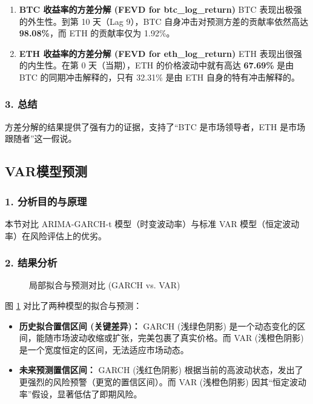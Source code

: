 \documentclass[a4paper]{ctexart}
\begin{document}
	\begin{enumerate}
		\item \textbf{BTC 收益率的方差分解 (FEVD for btc\_log\_return)}
		BTC 表现出极强的外生性。到第 10 天（Lag 9），BTC 自身冲击对预测方差的贡献率依然高达 \textbf{98.08\%}，而 ETH 的贡献率仅为 1.92\%。
		\item \textbf{ETH 收益率的方差分解 (FEVD for eth\_log\_return)}
		ETH 表现出很强的内生性。在第 0 天（当期），ETH 的价格波动中就有高达 \textbf{67.69\%} 是由 BTC 的同期冲击解释的，只有 32.31\% 是由 ETH 自身的特有冲击解释的。
	\end{enumerate}
	
	\subsubsection{3. 总结}
	方差分解的结果提供了强有力的证据，支持了“BTC 是市场领导者，ETH 是市场跟随者”这一假说。
	
	\subsection{VAR模型预测}
	\subsubsection{1. 分析目的与原理}
	本节对比 ARIMA-GARCH-t 模型（时变波动率）与标准 VAR 模型（恒定波动率）在风险评估上的优劣。
	
	\subsubsection{2. 结果分析}
	\begin{figure}[htbp]
		\centering
		\caption{局部拟合与预测对比 (GARCH vs. VAR)}
		\label{fig:forecast_compare}
	\end{figure}
	
	图 \ref{fig:forecast_compare} 对比了两种模型的拟合与预测：
	\begin{itemize}
		\item \textbf{历史拟合置信区间 (关键差异)：} GARCH (浅绿色阴影) 是一个动态变化的区间，能随市场波动收缩或扩张，完美包裹了真实价格。而 VAR (浅橙色阴影) 是一个宽度恒定的区间，无法适应市场动态。
		\item \textbf{未来预测置信区间：} GARCH (浅红色阴影) 根据当前的高波动状态，发出了更强烈的风险预警（更宽的置信区间）。而 VAR (浅橙色阴影) 因其“恒定波动率”假设，显著低估了即期风险。
	\end{itemize}
	
\end{document}
